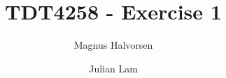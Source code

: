 \documentclass[a4paper, 10pt, titlepage]{article}
\title{TDT4258 - Exercise 1}
\author{Magnus Halvorsen
  \and Julian Lam
}
\begin{document}
  \maketitle
  \newpage

  
  \tableofcontents 
  \newpage
  \listoffigures
  \lstlistoflistings
  

  
  
  
  

  
\end{document}
